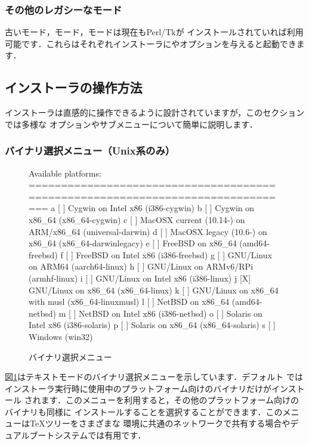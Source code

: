 \documentclass[uplatex,dvipdfmx,tombow]{jsarticle}
\begin{document}
\subsubsection{その他のレガシーなモード}

古いモード，モード，モードは現在もPerl/Tkが
インストールされていれば利用可能です．これらはそれぞれインストーラにやオプションを与えると起動できます．

\subsection{インストーラの操作方法}
\label{sec:runinstall}

インストーラは直感的に操作できるように設計されていますが，このセクションでは多様な
オプションやサブメニューについて簡単に説明します．

\subsubsection{バイナリ選択メニュー（Unix系のみ）}
\label{sec:binary}

\begin{figure}[tb]
\begin{boxedverbatim}
Available platforms:
===============================================================================
   a [ ] Cygwin on Intel x86 (i386-cygwin)
   b [ ] Cygwin on x86_64 (x86_64-cygwin)
   c [ ] MacOSX current (10.14-) on ARM/x86_64 (universal-darwin)
   d [ ] MacOSX legacy (10.6-) on x86_64 (x86_64-darwinlegacy)
   e [ ] FreeBSD on x86_64 (amd64-freebsd)
   f [ ] FreeBSD on Intel x86 (i386-freebsd)
   g [ ] GNU/Linux on ARM64 (aarch64-linux)
   h [ ] GNU/Linux on ARMv6/RPi (armhf-linux)
   i [ ] GNU/Linux on Intel x86 (i386-linux)
   j [X] GNU/Linux on x86_64 (x86_64-linux)
   k [ ] GNU/Linux on x86_64 with musl (x86_64-linuxmusl)
   l [ ] NetBSD on x86_64 (amd64-netbsd)
   m [ ] NetBSD on Intel x86 (i386-netbsd)
   o [ ] Solaris on Intel x86 (i386-solaris)
   p [ ] Solaris on x86_64 (x86_64-solaris)
   s [ ] Windows (win32)
\end{boxedverbatim}
\vspace{-1zh}
\caption{バイナリ選択メニュー}\label{fig:bin-text}
\end{figure}

図\ref{fig:bin-text}はテキストモードのバイナリ選択メニューを示しています．デフォルト
ではインストーラ実行時に使用中のプラットフォーム向けのバイナリだけがインストール
されます．このメニューを利用すると，その他のプラットフォーム向けのバイナリも同様に
インストールすることを選択することができます．このメニューは\TeX ツリーをさまざまな
環境に共通のネットワークで共有する場合やデュアルブートシステムでは有用です．
\end{document}
